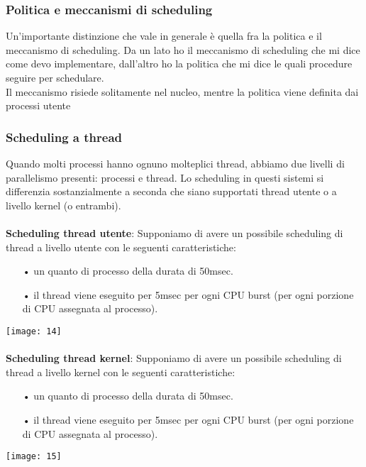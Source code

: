 \documentclass{article}
\begin{document}
\subsubsection{Politica e meccanismi di scheduling}
Un’importante distinzione che vale in generale è quella fra la politica e il meccanismo di scheduling. Da un lato ho il meccanismo di scheduling che mi dice
come devo implementare, dall’altro ho la politica che mi dice le quali procedure
seguire per schedulare.
\\Il meccanismo risiede solitamente nel nucleo, mentre la politica viene definita
dai processi utente

\subsubsection{Scheduling a thread}
Quando molti processi hanno ognuno molteplici thread, abbiamo due livelli
di parallelismo presenti: processi e thread. Lo scheduling in questi sistemi si
differenzia sostanzialmente a seconda che siano supportati thread utente o a
livello kernel (o entrambi).
\\
\\
\textbf{Scheduling thread utente}: Supponiamo di avere un possibile scheduling di
thread a livello utente con le seguenti caratteristiche:
\begin{enumerate}
   \item[•] un quanto di processo della durata di 50msec.
   \item[•] il thread viene eseguito per 5msec per ogni CPU burst (per ogni porzione
            di CPU assegnata al processo).
\end{enumerate}
\texttt{[image: 14]}
\\\\
\textbf{Scheduling thread kernel}: Supponiamo di avere un possibile scheduling di
thread a livello kernel con le seguenti caratteristiche:
\begin{enumerate}
   \item[•] un quanto di processo della durata di 50msec.
   \item[•] il thread viene eseguito per 5msec per ogni CPU burst (per ogni porzione
            di CPU assegnata al processo).
\end{enumerate}
\texttt{[image: 15]}

\newpage
\end{document}
